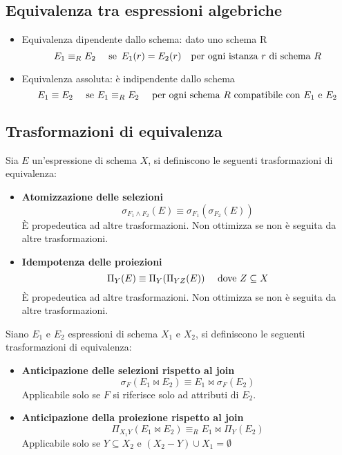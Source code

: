 \documentclass[a4paper, 10pt]{article}
\theoremstyle{definition}
\begin{document}
		\subsection{Equivalenza tra espressioni algebriche}
			\begin{itemize}
				\item Equivalenza dipendente dallo schema: dato uno
				schema R
				\[
					E_1 \equiv_R E_2 \quad \textup{ se } \, E_1(r) = E_2(r) \quad \textup{per ogni istanza } r \textup{ di schema } R
				\]
				\item Equivalenza assoluta: è indipendente dallo schema
				\[
					E_1 \equiv E_2 \quad \textup{ se } E_1 \equiv_R E_2 \quad \textup{ per ogni schema } R \textup{ compatibile con } E_1 \textup{ e } E_2
				\]
			\end{itemize}
		\subsection{Trasformazioni di equivalenza}
		
			Sia $E$ un'espressione di schema $X$, si definiscono
			le seguenti trasformazioni di equivalenza:
			\begin{itemize}
				\item \textbf{Atomizzazione delle selezioni}
					\[
						\sigma_{F_1 \wedge F_2} (E) \equiv \sigma_{F_1} (\sigma_{F_2} (E))
					\]
					È propedeutica ad altre trasformazioni. Non ottimizza se
					non è seguita da altre trasformazioni.
				\item \textbf{Idempotenza delle proiezioni}
					\[
						\Pi_Y (E) \equiv \Pi_Y (\Pi_{YZ} (E)) \quad \textup{ dove } Z \subseteq X
					\]
					È propedeutica ad altre trasformazioni. Non ottimizza se
					non è seguita da altre trasformazioni.
			\end{itemize}
			
			Siano $E_1$ e $E_2$ espressioni di schema $X_1$ e $X_2$, si
			definiscono le seguenti trasformazioni di equivalenza:
			\begin{itemize}
				\item \textbf{Anticipazione delle selezioni rispetto al join}
					\[
						\sigma_F (E_1 \Join E_2) \equiv E_1 \Join \sigma_F (E_2) 
					\]
					Applicabile solo se $F$ si riferisce solo ad attributi di $E_2$.
				\item \textbf{Anticipazione della proiezione rispetto al join}
					\[
						\Pi_{X_1 Y} (E_1 \Join E_2) \equiv_R E_1 \Join \Pi_Y (E_2)
					\]
					Applicabile solo se $Y \subseteq X_2$ e $(X_2 - Y) \cup X_1 = \emptyset$
			\end{itemize}
			
\end{document}
